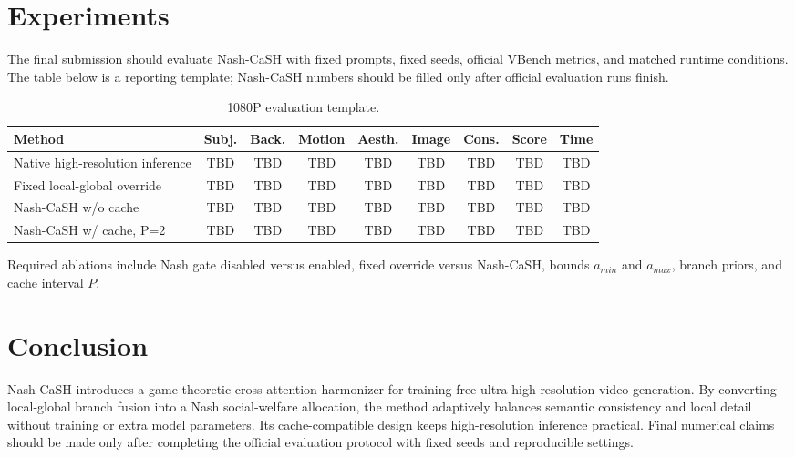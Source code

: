 \section{Experiments}

The final submission should evaluate Nash-CaSH with fixed prompts, fixed seeds, official VBench metrics, and matched runtime conditions.
The table below is a reporting template; Nash-CaSH numbers should be filled only after official evaluation runs finish.

\begin{table}[t]
\centering
\caption{1080P evaluation template.}
\begin{tabular}{lcccccccc}
\hline
Method & Subj. & Back. & Motion & Aesth. & Image & Cons. & Score & Time \\
\hline
Native high-resolution inference & TBD & TBD & TBD & TBD & TBD & TBD & TBD & TBD \\
Fixed local-global override & TBD & TBD & TBD & TBD & TBD & TBD & TBD & TBD \\
Nash-CaSH w/o cache & TBD & TBD & TBD & TBD & TBD & TBD & TBD & TBD \\
Nash-CaSH w/ cache, P=2 & TBD & TBD & TBD & TBD & TBD & TBD & TBD & TBD \\
\hline
\end{tabular}
\end{table}

Required ablations include Nash gate disabled versus enabled, fixed override versus Nash-CaSH, bounds $a_{min}$ and $a_{max}$, branch priors, and cache interval $P$.

\section{Conclusion}

Nash-CaSH introduces a game-theoretic cross-attention harmonizer for training-free ultra-high-resolution video generation.
By converting local-global branch fusion into a Nash social-welfare allocation, the method adaptively balances semantic consistency and local detail without training or extra model parameters.
Its cache-compatible design keeps high-resolution inference practical.
Final numerical claims should be made only after completing the official evaluation protocol with fixed seeds and reproducible settings.
